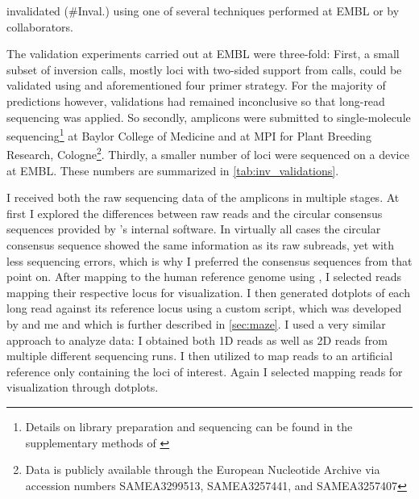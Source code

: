 \begin{table}[ht]
\begin{adjustbox}{inner,minipage=[b]{\textplusmargin}}
\begin{minipage}[t]{0.54\textplusmargin}
{                invalidated (\#Inval.) using one of several techniques performed
                at EMBL or by collaborators.}
            \end{minipage}
            \hspace{0.04\textplusmargin}
            \begin{minipage}[t]{0.42\textplusmargin}
                \centering
            \end{minipage}
        \end{adjustbox}
\end{table}


The validation experiments carried out at EMBL were three-fold: First, a small
subset of inversion calls, mostly loci with two-sided support from \delly calls,
could be validated using \pcr and aforementioned four primer strategy. For the
majority of predictions however, \pcr validations had remained inconclusive so
that long-read sequencing was applied. So secondly, amplicons were submitted to
\pacbio single-molecule sequencing\footnote{\label{footnote:xbpIhd}Details on
library preparation and sequencing can be found in the supplementary methods of
\cite{Sudmant2015}} at Baylor College of Medicine and at MPI for Plant Breeding
Research, Cologne\footnote{Data is publicly available through the European
Nucleotide Archive via accession numbers SAMEA3299513, SAMEA3257441, and
SAMEA3257407}. Thirdly, a smaller number of loci were sequenced on a
\minion device at EMBL. These numbers are
summarized in \cref{tab:inv_validations}.

I received both the raw sequencing data of the amplicons in multiple stages. At
first I explored the differences between raw \pacbio reads and the circular
consensus sequences provided by \pacbio’s internal software. In virtually all
cases the circular consensus sequence showed the same information as its raw
subreads, yet with less sequencing errors, which is why I preferred the
consensus sequences from that point on. After mapping to the human reference
genome using \blasr, I selected reads mapping their respective locus for
visualization. I then generated dotplots of each long read against its reference
locus using a custom script, which was developed by \markus and me and which is
further described in \cref{sec:maze}. I used a very similar approach to analyze
\minion data: I obtained both 1D reads as well as 2D reads from multiple
different sequencing runs. I then utilized \last to map reads to an artificial
reference only containing the loci of interest. Again I selected mapping reads
for visualization through dotplots.

